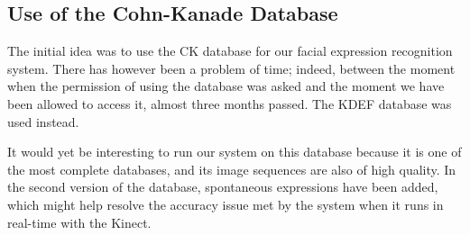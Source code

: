 \subsection{Use of the Cohn-Kanade Database}

\vspace{\baselineskip}
\noindent The initial idea was to use the CK database for our facial expression recognition system. There has however been a problem of time; indeed, between the moment when the permission of using the database was asked and the moment we have been allowed to access it, almost three months passed. The KDEF database was used instead. 
\newline

\noindent It would yet be interesting to run our system on this database because it is one of the most complete databases, and its image sequences are also of high quality. In the second version of the database, spontaneous expressions have been added, which might help resolve the accuracy issue met by the system when it runs in real-time with the Kinect.
\newline

